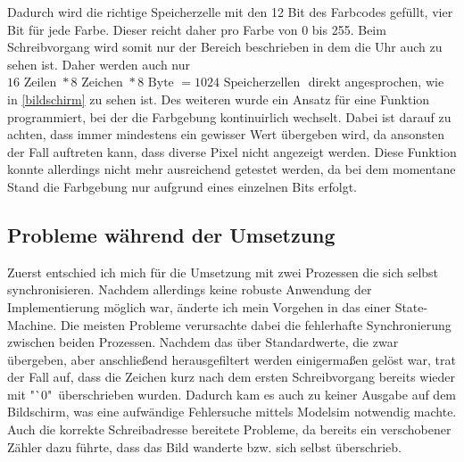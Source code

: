 \documentclass[12pt,a4paper,bibliography=totoc,listof=totoc]{scrartcl}
\begin{document}
Dadurch wird die richtige Speicherzelle mit den 12 Bit des Farbcodes gefüllt, vier Bit für jede Farbe. 
Dieser reicht daher pro Farbe von 0 bis 255. Beim Schreibvorgang wird somit nur der Bereich beschrieben in dem die Uhr auch zu sehen ist. 
Daher werden auch nur $16 \text{ Zeilen } * 8 \text{ Zeichen } * 8 \text{ Byte } = 1024 \text{ Speicherzellen }$ direkt angesprochen, wie in 
\ref{bildschirm} zu sehen ist.
Des weiteren wurde ein Ansatz für eine Funktion programmiert, bei der die Farbgebung kontinuirlich wechselt. Dabei ist darauf zu achten, dass 
immer 
mindestens ein gewisser Wert übergeben wird, da ansonsten der Fall auftreten kann, dass diverse Pixel nicht angezeigt werden. Diese Funktion 
konnte allerdings nicht mehr 
ausreichend getestet werden, da bei dem momentane Stand die Farbgebung nur aufgrund eines einzelnen Bits erfolgt. 


\subsection {Probleme während der Umsetzung}

Zuerst entschied ich mich für die Umsetzung mit zwei Prozessen die sich selbst synchronisieren. Nachdem allerdings keine robuste Anwendung 
der Implementierung möglich war, änderte ich mein Vorgehen in das einer State-Machine.
Die meisten Probleme verursachte dabei die fehlerhafte Synchronierung zwischen beiden Prozessen. Nachdem das über Standardwerte, die zwar 
übergeben, aber anschließend herausgefiltert werden einigermaßen gelöst war, trat der Fall auf,
dass die Zeichen kurz nach dem ersten Schreibvorgang bereits wieder mit "`0"\, überschrieben wurden. Dadurch kam es auch zu keiner Ausgabe 
auf dem Bildschirm, was eine aufwändige Fehlersuche mittels Modelsim notwendig machte. Auch die korrekte Schreibadresse bereitete Probleme, 
da bereits ein verschobener Zähler dazu führte, dass das Bild wanderte bzw. sich selbst überschrieb.
\end{document}
